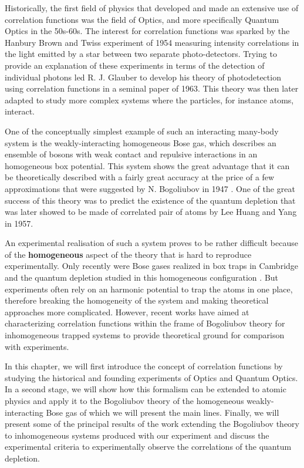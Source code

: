 Historically, the first field of physics that developed and made an extensive use of correlation functions was the field of Optics, and more specifically Quantum Optics in the 50s-60s. The interest for correlation functions was sparked by the Hanbury Brown and Twiss experiment of 1954 measuring intensity correlations in the light emitted by a star between two separate photo-detectors. Trying to provide an explanation of these experiments in terms of the detection of individual photons led R. J. Glauber to develop his theory of photodetection \cite{glauber1963quantum} using correlation functions in a seminal paper of 1963. This theory was then later adapted to study more complex systems where the particles, for instance atoms, interact. 

One of the conceptually simplest example of such an interacting many-body system is the weakly-interacting homogeneous Bose gas, which describes an ensemble of bosons with weak contact and repulsive interactions in an homogeneous box potential. This system shows the great advantage that it can be theoretically described with a fairly great accuracy at the price of a few approximations that were suggested by N. Bogoliubov in 1947 \cite{bogoliubov1947}. One of the great success of this theory was to predict the existence of the quantum depletion that was later showed to be made of \kmk correlated pair of atoms by Lee Huang and Yang \cite{lee1957} in 1957.

An experimental realisation of such a system proves to be rather difficult because of the \textbf{homogeneous} aspect of the theory that is hard to reproduce experimentally. Only recently were Bose gases realized in box traps in Cambridge \cite{gaunt2013bose} and the quantum depletion studied in this homogeneous configuration \cite{lopes2017}. But experiments often rely on an harmonic potential to trap the atoms in one place, therefore breaking the homogeneity of the system and making theoretical approaches more complicated. However, recent works \cite{butera2020,mathey2009noise,toth2008theory} have aimed at characterizing correlation functions within the frame of Bogoliubov theory for inhomogeneous trapped systems to provide theoretical ground for comparison with experiments. 

In this chapter, we will first introduce the concept of correlation functions by studying the historical and founding experiments of Optics and Quantum Optics. In a second stage, we will show how this formalism can be extended to atomic physics and apply it to the Bogoliubov theory of the homogeneous weakly-interacting Bose gas of which we will present the main lines. Finally, we will present some of the principal results of the work \cite{butera2020} extending the Bogoliubov theory to inhomogeneous systems produced with our experiment and discuss the experimental criteria to experimentally observe the \kmk correlations of the quantum depletion. 




